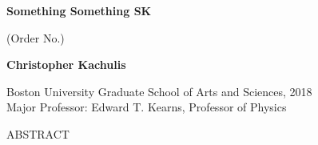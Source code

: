 
\begin{center}
\vspace{0.125in}
{\bf Something Something SK}

{(Order No.\hspace{0.75in})}

{\bf Christopher Kachulis}

{Boston University Graduate School of Arts and Sciences, 2018\\
Major Professor: Edward T. Kearns, Professor of Physics}

{{ABSTRACT}}
\end{center}



